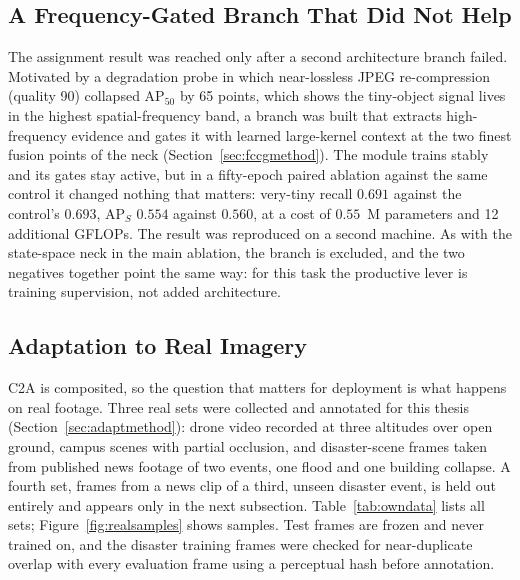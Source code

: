 \subsection{A Frequency-Gated Branch That Did Not Help}
The assignment result was reached only after a second architecture branch failed.
Motivated by a degradation probe in which near-lossless JPEG re-compression
(quality 90) collapsed $\mathrm{AP}_{50}$ by 65 points, which shows the
tiny-object signal lives in the highest spatial-frequency band, a branch was
built that extracts high-frequency evidence and gates it with learned
large-kernel context at the two finest fusion points of the neck (Section~\ref{sec:fccgmethod}).
The module trains stably and its gates stay active, but in a fifty-epoch paired
ablation against the same control it changed nothing that matters: very-tiny
recall $0.691$ against the control's $0.693$, $\mathrm{AP}_S$ $0.554$ against
$0.560$, at a cost of $0.55$~M parameters and 12 additional GFLOPs. The result
was reproduced on a second machine. As with the state-space neck in the main
ablation, the branch is excluded, and the two negatives together point the same
way: for this task the productive lever is training supervision, not added
architecture.

\subsection{Adaptation to Real Imagery}
\label{sec:realresults}
C2A is composited, so the question that matters for deployment is what happens on
real footage. Three real sets were collected and annotated for this thesis
(Section~\ref{sec:adaptmethod}): drone video recorded at three altitudes over open ground, campus
scenes with partial occlusion, and disaster-scene frames taken from published
news footage of two events, one flood and one building collapse. A fourth set,
frames from a news clip of a third, unseen disaster event, is held out entirely
and appears only in the next subsection. Table~\ref{tab:owndata} lists all sets;
Figure~\ref{fig:realsamples} shows samples. Test frames are frozen and never
trained on, and the disaster training frames were checked for near-duplicate
overlap with every evaluation frame using a perceptual hash before annotation.

